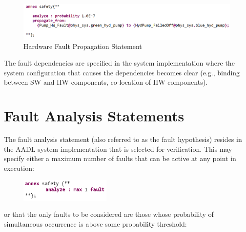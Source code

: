 \begin{figure}[h!]
	\begin{center}
		\includegraphics[width=1.0\textwidth]{images/hw_prop_stmt.png}
	\end{center}
	\vspace{-0.1in}
	\caption{Hardware Fault Propagation Statement}
	\label{fig:hwFaultProp}
\end{figure}

The fault dependencies are specified in the system implementation where the system configuration that causes the dependencies becomes clear (e.g., binding between SW and HW components, co-location of HW components). 



\section{Fault Analysis Statements}
The fault analysis statement (also referred to as the fault hypothesis) resides in the AADL system implementation that is selected for verification. This may specify either a maximum number of faults that can be active at any point in execution:

\begin{figure}[h!]
	\vspace{-0.1in}
		\includegraphics[width=0.4\textwidth]{images/hypothesisMaxN.png}
	\vspace{-0.1in}
	\label{fig:hypothesisMaxN}
\end{figure}
or that the only faults to be considered are those whose probability of simultaneous occurrence is above some probability threshold: 

